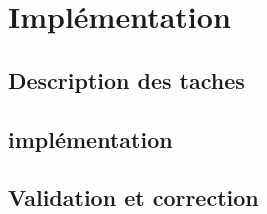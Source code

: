 \section{Implémentation}	
		\subsection{Description des taches}
		\subsection{implémentation}
		\subsection{Validation et correction}